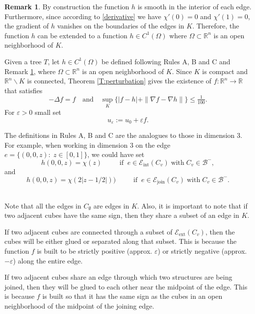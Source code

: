 \documentclass[11pt,reqno]{amsart}
\newcommand{\R}{{\mathbb R}}
\newcommand{\ep}{\varepsilon}
\theoremstyle{definition}
\newtheorem{remark}{Remark}
\begin{document}
\begin{remark}\label{extension2}
By construction the function $h$ is smooth in the interior of each edge. Furthermore, since according to \eqref{derivative} we have $\chi'(0)=0$ and $\chi'(1)=0 $, the  gradient of $h$ vanishes on the boundaries of the edges in $K$. Therefore,  the function $h$ can be extended to a function $h \in C^1(\Omega)$ where $\Omega \subset \R^n$ is an open neighborhood of $K$.
\end{remark}


 Given a tree $T$,  let $h \in C^1(\Omega)$ be defined following Rules A, B and C and Remark \ref{extension2}, where $\Omega \subset \R^n$ is an open neighborhood of $K$.  Since $K$ is compact and $\R^n \backslash K$ is connected,  Theorem \ref{T:perturbation} gives the existence of  $f: \R^n \to \R$  that satisfies 
 \[-\Delta f=f \quad \text{and} \quad  \sup_{ K}\{|f-h|+ \|\nabla f-\nabla h\|\} \leq \tfrac{1}{100}.\] 
For $\ep>0$ small set 
 \[u_\ep:= u_0 +\ep f.\]  



The definitions in Rules A, B and C are the analogues to those in dimension $3$. For example, when working in dimension $3$ on the edge $e=\{(0,0,z):\; z\in [0,1]\}$, we could have set 
\[h(0,0,z)=\chi (z)  \;\; \qquad \text{if}\;\; e \in \mathcal E_{\text{int}} (C_v) \; \text{with} \;C_v \in  \mathcal B^- ,\]
and 
\[h(0,0,z)=\chi (2  |z-1/2|))  \;\; \qquad \text{if}\;\; e \in \mathcal E_{\text{join}} (C_v) \; \text{with}\; C_v \in  \mathcal B^-.\] \ \smallskip



Note that all the edges in $C_\emptyset$ are edges in $K$. Also, it is important to note that if two adjacent cubes have the same sign, then they share a subset of an edge in $K$.

If two adjacent cubes are connected through a subset of  $\mathcal E_{\text{ext}}(C_v)$, then the cubes will be either glued or separated along that subset. This is because the function $f$ is built to be strictly positive (approx. $\ep$) or strictly negative (approx. $-\ep$) along the entire edge.

If two adjacent cubes share an edge through which two structures are being joined, then they will be glued to each other near the midpoint of the edge. This is because $f$ is built so that it has the same sign as the cubes in an open neighborhood of the midpoint of the joining edge.
\end{document}
